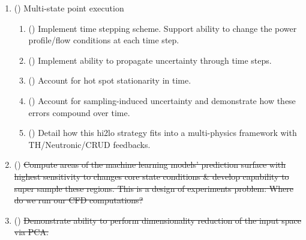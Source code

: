 \begin{enumerate}
\begin{enumerate}
\begin{enumerate}
        \end{enumerate}
        \item (\checkmark) Multi-state point execution
        \begin{enumerate}
            \item (\checkmark) Implement time stepping scheme.  Support ability to change the power profile/flow conditions at each time step.
            \item (\checkmark) Implement ability to propagate uncertainty through time steps.
            \item (\checkmark) {\color{blue} Account for hot spot stationarity in time.}
            \item (\checkmark) Account for sampling-induced uncertainty and demonstrate how these errors compound over time.
            \item (\checkmark) {\color{blue} Detail how this hi2lo strategy fits into a multi-physics framework with TH/Neutronic/CRUD feedbacks.}
        \end{enumerate}
        \item (\xmark) \sout{Compute areas of the machine learning models' prediction surface with highest
                             sensitivity to changes core state conditions \& develop capability to super sample these regions.  This is a design of experiments problem: Where do we run our CFD computations?}
        \item (\xmark) \sout{Demonstrate ability to perform dimensionality reduction of the input space via PCA.}

    \end{enumerate}


\end{enumerate}

